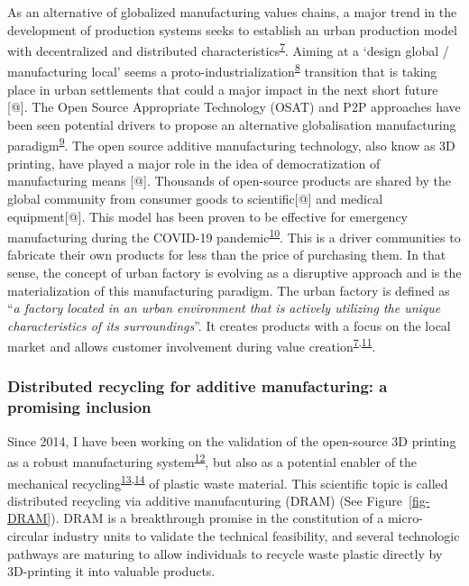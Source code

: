 \documentclass[
  11pt,
  a4paperpaper,
  onecolumn]{article}
\begin{document}
As an alternative of globalized manufacturing values chains, a major
trend in the development of production systems seeks to establish an
urban production model with decentralized and distributed
characteristics\textsuperscript{\protect\hyperlink{ref-Herrmann2020}{7}}.
Aiming at a `design global / manufacturing local' seems a
proto-industrialization\textsuperscript{\protect\hyperlink{ref-sabel1985}{8}}
transition that is taking place in urban settlements that could a major
impact in the next short future {[}@{]}. The Open Source Appropriate
Technology (OSAT) and P2P approaches have been seen potential drivers to
propose an alternative globalisation manufacturing
paradigm\textsuperscript{\protect\hyperlink{ref-Heikkinen2020a}{9}}. The
open source additive manufacturing technology, also know as 3D printing,
have played a major role in the idea of democratization of manufacturing
means {[}@{]}. Thousands of open-source products are shared by the
global community from consumer goods to scientific{[}@{]} and medical
equipment{[}@{]}. This model has been proven to be effective for
emergency manufacturing during the COVID-19
pandemic\textsuperscript{\protect\hyperlink{ref-Pearce2020a}{10}}. This
is a driver communities to fabricate their own products for less than
the price of purchasing them. In that sense, the concept of urban
factory is evolving as a disruptive approach and is the materialization
of this manufacturing paradigm. The urban factory is defined as
``\emph{a factory located in an urban environment that is actively
utilizing the unique characteristics of its surroundings}''. It creates
products with a focus on the local market and allows customer
involvement during value
creation\textsuperscript{\protect\hyperlink{ref-Herrmann2020}{7},\protect\hyperlink{ref-Ijassi2022}{11}}.

\hypertarget{distributed-recycling-for-additive-manufacturing-a-promising-inclusion}{%
\subsubsection{Distributed recycling for additive manufacturing: a
promising
inclusion}\label{distributed-recycling-for-additive-manufacturing-a-promising-inclusion}}

Since 2014, I have been working on the validation of the open-source 3D
printing as a robust manufacturing
system\textsuperscript{\protect\hyperlink{ref-CruzSanchez2014}{12}}, but
also as a potential enabler of the mechanical
recycling\textsuperscript{\protect\hyperlink{ref-Cruz2015}{13},\protect\hyperlink{ref-CruzSanchez2017}{14}}
of plastic waste material. This scientific topic is called distributed
recycling via additive manufacuturing (DRAM) (See
Figure~\ref{fig-DRAM}). DRAM is a breakthrough promise in the
constitution of a micro-circular industry units to validate the
technical feasibility, and several technologic pathways are maturing to
allow individuals to recycle waste plastic directly by 3D-printing it
into valuable products.
\end{document}
